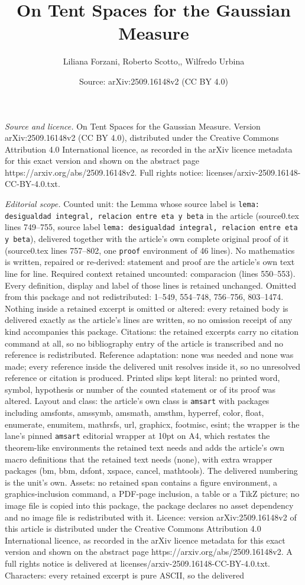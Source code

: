 \documentclass[10pt,a4paper]{amsart}
\title[On Tent Spaces for the Gaussian Measure]{On Tent Spaces for the Gaussian Measure}
\author{Liliana Forzani, Roberto Scotto,, Wilfredo Urbina}
\date{Source: arXiv:2509.16148v2 (CC BY 4.0)}
\begin{document}
\maketitle

\noindent\emph{Source and licence.} On Tent Spaces for the Gaussian Measure. Version arXiv:2509.16148v2 (CC BY 4.0), distributed under the Creative Commons Attribution 4.0 International licence, as recorded in the arXiv licence metadata for this exact version and shown on the abstract page https://arxiv.org/abs/2509.16148v2. Full rights notice: licenses/arxiv-2509.16148-CC-BY-4.0.txt.\par\smallskip

\noindent\textit{Editorial scope.} Counted unit: the Lemma whose source label is \texttt{lema: desigualdad integral, relacion entre eta y beta} in the article (source0.tex lines 749--755, source label \texttt{lema: desigualdad integral, relacion entre eta y beta}), delivered together with the article's own complete original proof of it (source0.tex lines 757--802, one \texttt{proof} environment of 46 lines). No mathematics is written, repaired or re-derived: statement and proof are the article's own text line for line. Required context retained uncounted: comparacion (lines 550--553). Every definition, display and label of those lines is retained unchanged. Omitted from this package and not redistributed: 1--549, 554--748, 756--756, 803--1474. Nothing inside a retained excerpt is omitted or altered: every retained body is delivered exactly as the article's lines are written, so no omission receipt of any kind accompanies this package. Citations: the retained excerpts carry no citation command at all, so no bibliography entry of the article is transcribed and no reference is redistributed. Reference adaptation: none was needed and none was made; every reference inside the delivered unit resolves inside it, so no unresolved reference or citation is produced. Printed slips kept literal: no printed word, symbol, hypothesis or number of the counted statement or of its proof was altered. Layout and class: the article's own class is \texttt{amsart} with packages including amsfonts, amssymb, amsmath, amsthm, hyperref, color, float, enumerate, enumitem, mathrsfs, url, graphicx, footmisc, esint; the wrapper is the lane's pinned \texttt{amsart} editorial wrapper at 10pt on A4, which restates the theorem-like environments the retained text needs and adds the article's own macro definitions that the retained text needs (none), with extra wrapper packages (bm, bbm, dsfont, xspace, cancel, mathtools). The delivered numbering is the unit's own. Assets: no retained span contains a figure environment, a graphics-inclusion command, a PDF-page inclusion, a table or a TikZ picture; no image file is copied into this package, the package declares no asset dependency and no image file is redistributed with it. Licence: version arXiv:2509.16148v2 of this article is distributed under the Creative Commons Attribution 4.0 International licence, as recorded in the arXiv licence metadata for this exact version and shown on the abstract page https://arxiv.org/abs/2509.16148v2. A full rights notice is delivered at licenses/arxiv-2509.16148-CC-BY-4.0.txt. Characters: every retained excerpt is pure ASCII, so the delivered 
\end{document}
